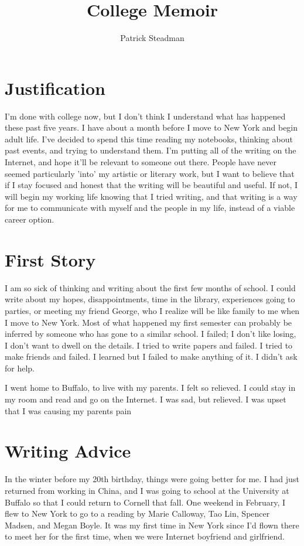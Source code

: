 \documentclass[12pt]{article}
\title{College Memoir}
\author{Patrick Steadman}
\begin{document}
\maketitle

\section{Justification}
I'm done with college now, but I don't think I understand what has happened
these past five years.  I have about a month before I move to New York and begin
adult life.  I've decided to spend this time reading my notebooks, thinking
about past events, and trying to understand them.  I'm putting all of the
writing on the Internet, and hope it'll be relevant to someone out there.
People have never seemed particularly 'into' my artistic or literary work, but I
want to believe that if I stay focused and honest that the writing will be
beautiful and useful.  If not, I will begin my working life knowing that I tried
writing, and that writing is a way for me to communicate with myself and the
people in my life, instead of a viable career option.

\section{First Story}
I am so sick of thinking and writing about the first few months of school.  I
could write about my hopes, disappointments, time in the library, experiences
going to parties, or meeting my friend George, who I realize will be like family
to me when I move to New York.  Most of what happened my first semester can
probably be inferred by someone who has gone to a similar school.  I failed; I
don't like losing, I don't want to dwell on the details.  I tried to write
papers and failed.  I tried to make friends and failed.  I learned but I failed
to make anything of it.  I didn't ask for help.

I went home to Buffalo, to live with my parents.  I felt so relieved.  I could
stay in my room and read and go on the Internet.  I was sad, but relieved.  I
was upset that I was causing my parents pain


\section{Writing Advice}
In the winter before my 20th birthday, things were going better for me.  I had
just returned from working in China, and I was going to school at the University
at Buffalo so that I could return to Cornell that fall.  One weekend in
February, I flew to New York to go to a reading by Marie Calloway, Tao Lin,
Spencer Madsen, and Megan Boyle.  It was my first time in New York since I'd
flown there to meet her for the first time, when we were Internet boyfriend and
girlfriend.  
\end{document}
